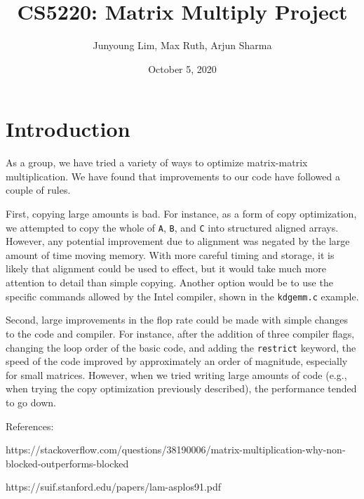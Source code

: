 \documentclass{article}
\title{CS5220: Matrix Multiply Project}
\author{Junyoung Lim, Max Ruth, Arjun Sharma}
\date{October 5, 2020}
\begin{document}
\maketitle

\section{Introduction}
As a group, we have tried a variety of ways to optimize matrix-matrix multiplication. We have found that improvements to our code have followed a couple of rules. 

First, copying large amounts is bad. For instance, as a form of copy optimization, we attempted to copy the whole of \texttt{A}, \texttt{B}, and \texttt{C} into structured aligned arrays. However, any potential improvement due to alignment was negated by the large amount of time moving memory. With more careful timing and storage, it is likely that alignment could be used to effect, but it would take much more attention to detail than simple copying. Another option would be to use the specific commands allowed by the Intel compiler, shown in the \texttt{kdgemm.c} example.

Second, large improvements in the flop rate could be made with simple changes to the code and compiler. For instance, after the addition of three compiler flags, changing the loop order of the basic code, and adding the \texttt{restrict} keyword, the speed of the code improved by approximately an order of magnitude, especially for small matrices. However, when we tried writing large amounts of code (e.g., when trying the copy optimization previously described), the performance tended to go down. 




References: 

https://stackoverflow.com/questions/38190006/matrix-multiplication-why-non-blocked-outperforms-blocked

https://suif.stanford.edu/papers/lam-asplos91.pdf
\end{document}
